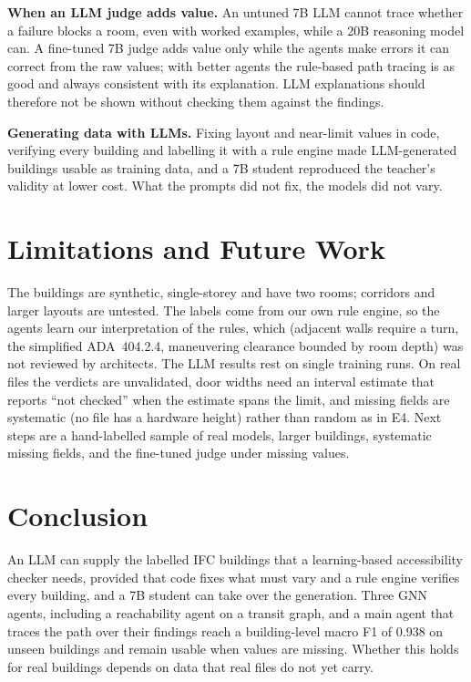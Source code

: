 \documentclass[conference]{IEEEtran}
\newcommand{\ada}[1]{ADA~#1}
\begin{document}
\textbf{When an LLM judge adds value.} An untuned 7B LLM cannot trace whether a failure blocks a room, even with
worked examples, while a 20B reasoning model can. A fine-tuned 7B judge adds value only while the agents make errors
it can correct from the raw values; with better agents the rule-based path tracing is as good and always
consistent with its explanation. LLM explanations should therefore not be shown without checking them against the
findings.

\textbf{Generating data with LLMs.} Fixing layout and near-limit values in code, verifying every building and
labelling it with a rule engine made LLM-generated buildings usable as training data, and a 7B student reproduced
the teacher's validity at lower cost. What the prompts did not fix, the models did not vary.

\section{Limitations and Future Work}

The buildings are synthetic, single-storey and have two rooms; corridors and larger layouts are untested. The labels
come from our own rule engine, so the agents learn our interpretation of the rules, which (adjacent walls require a
turn, the simplified \ada{404.2.4}, maneuvering clearance bounded by room depth) was not reviewed by architects. The
LLM results rest on single training runs. On real files the verdicts are unvalidated, door widths need an interval
estimate that reports ``not checked'' when the estimate spans the limit, and missing fields are systematic (no file
has a hardware height) rather than random as in E4. Next steps are a hand-labelled sample of real models, larger
buildings, systematic missing fields, and the fine-tuned judge under missing values.

\section{Conclusion}

An LLM can supply the labelled IFC buildings that a learning-based accessibility checker needs, provided that code
fixes what must vary and a rule engine verifies every building, and a 7B student can take over the generation.
Three GNN agents, including a reachability agent on a transit graph, and a main agent that traces the path over their
findings reach a building-level macro F1 of 0.938 on unseen buildings and remain usable when values are missing.
Whether this holds for real buildings depends on data that real files do not yet carry.



\end{document}
